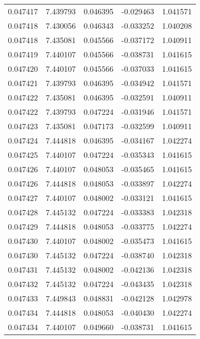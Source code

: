 \begin{tabular}{lrrrr}
0.047417    &  7.439793 &  0.046395 & -0.029463 &             1.041571 \\
0.047418    &  7.430056 &  0.046343 & -0.033252 &             1.040208 \\
0.047418    &  7.435081 &  0.045566 & -0.037172 &             1.040911 \\
0.047419    &  7.440107 &  0.045566 & -0.038731 &             1.041615 \\
0.047420    &  7.440107 &  0.045566 & -0.037033 &             1.041615 \\
0.047421    &  7.439793 &  0.046395 & -0.034942 &             1.041571 \\
0.047422    &  7.435081 &  0.046395 & -0.032591 &             1.040911 \\
0.047422    &  7.439793 &  0.047224 & -0.031946 &             1.041571 \\
0.047423    &  7.435081 &  0.047173 & -0.032599 &             1.040911 \\
0.047424    &  7.444818 &  0.046395 & -0.034167 &             1.042274 \\
0.047425    &  7.440107 &  0.047224 & -0.035343 &             1.041615 \\
0.047426    &  7.440107 &  0.048053 & -0.035465 &             1.041615 \\
0.047426    &  7.444818 &  0.048053 & -0.033897 &             1.042274 \\
0.047427    &  7.440107 &  0.048002 & -0.033121 &             1.041615 \\
0.047428    &  7.445132 &  0.047224 & -0.033383 &             1.042318 \\
0.047429    &  7.444818 &  0.048053 & -0.033775 &             1.042274 \\
0.047430    &  7.440107 &  0.048002 & -0.035473 &             1.041615 \\
0.047430    &  7.445132 &  0.047224 & -0.038740 &             1.042318 \\
0.047431    &  7.445132 &  0.048002 & -0.042136 &             1.042318 \\
0.047432    &  7.445132 &  0.047224 & -0.043435 &             1.042318 \\
0.047433    &  7.449843 &  0.048831 & -0.042128 &             1.042978 \\
0.047434    &  7.444818 &  0.048053 & -0.040430 &             1.042274 \\
0.047434    &  7.440107 &  0.049660 & -0.038731 &             1.041615 \\

\end{tabular}
